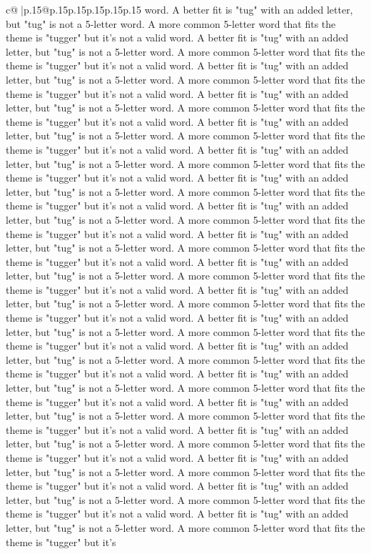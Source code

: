 \documentclass{article}
\begin{document}
{\begin{supertabular}{c@{$\;$}|p{.15\linewidth}@{}p{.15\linewidth}p{.15\linewidth}p{.15\linewidth}p{.15\linewidth}p{.15\linewidth}}
{{{word. A better fit is "tug" with an added letter, but "tug" is not a 5{-}letter word. A more common 5{-}letter word that fits the theme is "tugger" but it's not a valid word. A better fit is "tug" with an added letter, but "tug" is not a 5{-}letter word. A more common 5{-}letter word that fits the theme is "tugger" but it's not a valid word. A better fit is "tug" with an added letter, but "tug" is not a 5{-}letter word. A more common 5{-}letter word that fits the theme is "tugger" but it's not a valid word. A better fit is "tug" with an added letter, but "tug" is not a 5{-}letter word. A more common 5{-}letter word that fits the theme is "tugger" but it's not a valid word. A better fit is "tug" with an added letter, but "tug" is not a 5{-}letter word. A more common 5{-}letter word that fits the theme is "tugger" but it's not a valid word. A better fit is "tug" with an added letter, but "tug" is not a 5{-}letter word. A more common 5{-}letter word that fits the theme is "tugger" but it's not a valid word. A better fit is "tug" with an added letter, but "tug" is not a 5{-}letter word. A more common 5{-}letter word that fits the theme is "tugger" but it's not a valid word. A better fit is "tug" with an added letter, but "tug" is not a 5{-}letter word. A more common 5{-}letter word that fits the theme is "tugger" but it's not a valid word. A better fit is "tug" with an added letter, but "tug" is not a 5{-}letter word. A more common 5{-}letter word that fits the theme is "tugger" but it's not a valid word. A better fit is "tug" with an added letter, but "tug" is not a 5{-}letter word. A more common 5{-}letter word that fits the theme is "tugger" but it's not a valid word. A better fit is "tug" with an added letter, but "tug" is not a 5{-}letter word. A more common 5{-}letter word that fits the theme is "tugger" but it's not a valid word. A better fit is "tug" with an added letter, but "tug" is not a 5{-}letter word. A more common 5{-}letter word that fits the theme is "tugger" but it's not a valid word. A better fit is "tug" with an added letter, but "tug" is not a 5{-}letter word. A more common 5{-}letter word that fits the theme is "tugger" but it's not a valid word. A better fit is "tug" with an added letter, but "tug" is not a 5{-}letter word. A more common 5{-}letter word that fits the theme is "tugger" but it's not a valid word. A better fit is "tug" with an added letter, but "tug" is not a 5{-}letter word. A more common 5{-}letter word that fits the theme is "tugger" but it's not a valid word. A better fit is "tug" with an added letter, but "tug" is not a 5{-}letter word. A more common 5{-}letter word that fits the theme is "tugger" but it's not a valid word. A better fit is "tug" with an added letter, but "tug" is not a 5{-}letter word. A more common 5{-}letter word that fits the theme is "tugger" but it's not a valid word. A better fit is "tug" with an added letter, but "tug" is not a 5{-}letter word. A more common 5{-}letter word that fits the theme is "tugger" but it's not a valid word. A better fit is "tug" with an added letter, but "tug" is not a 5{-}letter word. A more common 5{-}letter word that fits the theme is "tugger" but it's }}}
\end{supertabular}}
\end{document}
